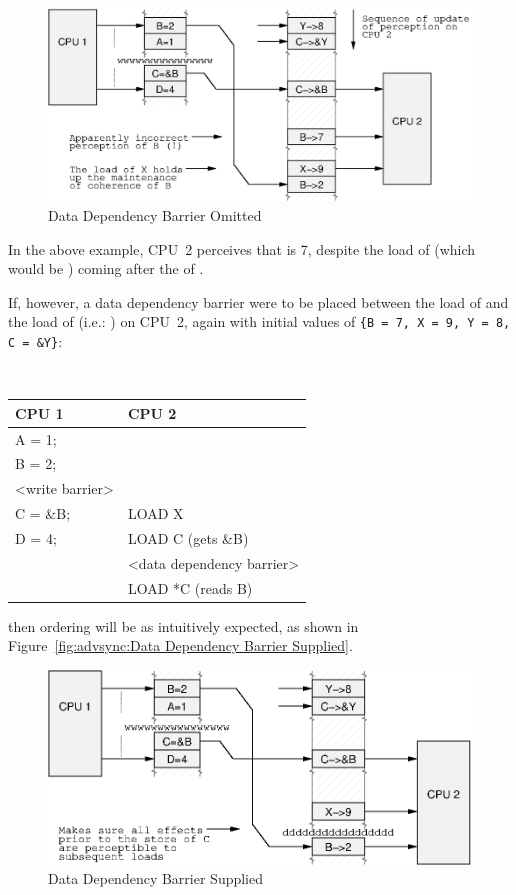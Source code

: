 \begin{figure}[htb]
\centering
\includegraphics{advsync/DataDependencyNeeded}
\caption{Data Dependency Barrier Omitted}
\end{figure}

In the above example, CPU~2 perceives that  is 7,
despite the load of 
(which would be ) coming after the  of .

If, however, a data dependency barrier were to be placed between the load of
 and the load of  (i.e.: ) on CPU~2, again with initial
values of {\tt \{B = 7, X = 9, Y = 8, C = \&Y\}}:

\vspace{5pt}
\begin{minipage}[t]{\columnwidth}
\tt
\scriptsize
\begin{tabular}{l|p{1.5in}}
	CPU 1 &		CPU 2 \\
	\hline
	A = 1; & \\
	B = 2; & \\
	<write barrier> & \\
	C = \&B; & 	LOAD X\\
	D = 4;	&	LOAD C (gets \&B) \\
		&	<data dependency barrier> \\
		&	LOAD *C (reads B) \\
\end{tabular}
\end{minipage}
\vspace{5pt}

then ordering will be as intuitively expected, as shown in
Figure~\ref{fig:advsync:Data Dependency Barrier Supplied}.

\begin{figure}[htb]
\centering
\includegraphics{advsync/DataDependencySupplied}
\caption{Data Dependency Barrier Supplied}
\end{figure}

